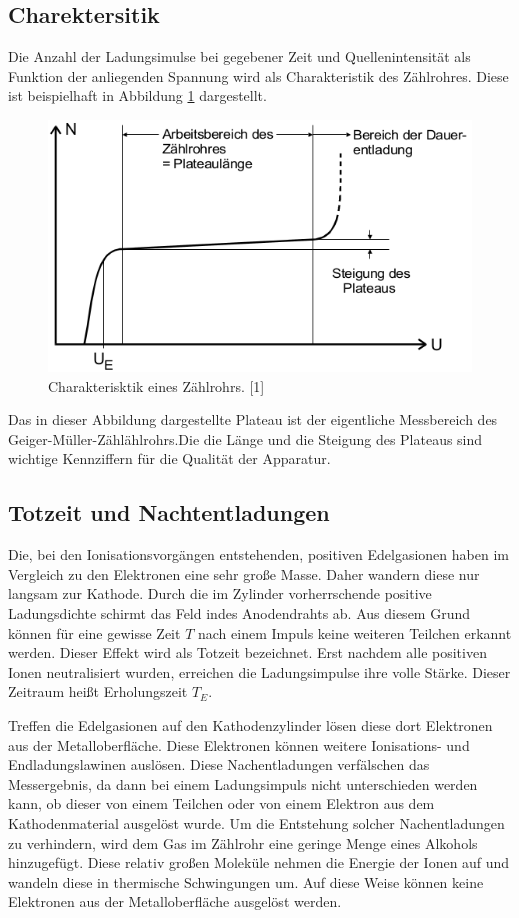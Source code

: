 \documentclass[11pt,ngerman,a4paper]{article}
\begin{document}
\subsection{Charektersitik}
Die Anzahl der Ladungsimulse bei gegebener Zeit und Quellenintensität als Funktion der anliegenden Spannung wird als Charakteristik des Zählrohres. Diese ist beispielhaft in Abbildung \ref{abb3} dargestellt.
\begin{figure}[htp]
\centering
\includegraphics[scale=0.60]{abb3.png}
\caption{Charakterisktik eines Zählrohrs. [1]}
\label{abb3}
\end{figure}
Das in dieser Abbildung dargestellte Plateau ist der eigentliche Messbereich des Geiger-Müller-Zählählrohrs.Die die Länge und die Steigung des Plateaus sind wichtige Kennziffern für die Qualität der Apparatur.
 
\subsection{Totzeit und Nachtentladungen}

Die, bei den Ionisationsvorgängen entstehenden, positiven Edelgasionen haben im Vergleich zu den Elektronen eine sehr große Masse. Daher wandern diese nur langsam zur Kathode. Durch die im Zylinder vorherrschende positive Ladungsdichte schirmt das Feld indes Anodendrahts ab. Aus diesem Grund können für eine gewisse Zeit $T$ nach einem Impuls keine weiteren Teilchen erkannt werden. Dieser Effekt wird als Totzeit bezeichnet. Erst nachdem alle positiven Ionen neutralisiert wurden, erreichen die Ladungsimpulse ihre volle Stärke. Dieser Zeitraum heißt Erholungszeit $T_E$.

\noindent
Treffen die Edelgasionen auf den Kathodenzylinder lösen diese dort Elektronen aus der Metalloberfläche. Diese Elektronen können weitere Ionisations- und Endladungslawinen auslösen. Diese Nachentladungen verfälschen das Messergebnis, da dann bei einem Ladungsimpuls nicht unterschieden werden kann, ob dieser von einem Teilchen oder von einem Elektron aus dem Kathodenmaterial ausgelöst wurde. Um die Entstehung solcher Nachentladungen zu verhindern, wird dem Gas im Zählrohr eine geringe Menge eines Alkohols hinzugefügt. Diese relativ großen Moleküle nehmen die Energie der Ionen auf und wandeln diese in thermische Schwingungen um. Auf diese Weise können keine Elektronen aus der Metalloberfläche ausgelöst werden.
\end{document}
